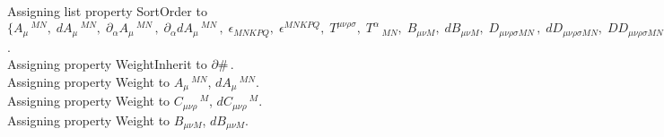 \documentclass[11pt]{article}
\begin{document}
Assigning list property SortOrder to $\{{A}_{\mu}\,^{M N},\; {dA}_{\mu}\,^{M N},\; {\partial}_{\alpha}{{A}_{\mu}\,^{M N}}\, ,\; {\partial}_{\alpha}{{dA}_{\mu}\,^{M N}}\, ,\; {\epsilon}_{M N K P Q},\; {\epsilon}^{M N K P Q},\; {T}^{\mu \nu \rho \sigma},\; {T}^{\alpha}\,_{M N},\; {B}_{\mu \nu M},\; {dB}_{\mu \nu M},\; {D}_{\mu \nu \rho \sigma M N}\, ,\; {dD}_{\mu \nu \rho \sigma M N},\; {DD}_{\mu \nu \rho \sigma M N},\; {F}_{\mu \nu \rho M},\; {F}_{\mu \nu \rho \sigma}\,^{M},\; {\partial}_{\mu}{{A}_{\mu}\,^{M N}}\, ,\; {\partial}_{\alpha}{{F}_{\mu \nu}\,^{M N}}\, ,\; {\partial}_{\alpha}{{B}_{\mu \nu M}}\, ,\; {\partial}_{\alpha}{{dB}_{\mu \nu M}}\, ,\; {\partial}_{\alpha}{{F}_{\mu \nu \rho M}}\, ,\; {\partial}_{\alpha}{{C}_{\mu \nu \rho}\,^{M}}\, ,\; {\partial}_{\alpha}{{dC}_{\mu \nu \rho}\,^{M}}\, ,\; {\partial}_{\alpha}{{F}_{\mu \nu \rho \sigma}\,^{M}}\, ,\; {\partial}_{\alpha}{{G}_{\mu \nu \rho \sigma M N}}\, ,\; {\partial}_{\alpha}{{dG}_{\mu \nu \rho \sigma M N}}\, ,\; {\delta}^{M1}\,_{M},\; {\delta}_{M1}\,^{M},\; a1,\; a2,\; a3,\; a4,\; a5,\; a6,\; a7,\; a8,\; a9,\; a10,\; a11,\; a12,\; b1,\; b2,\; b3,\; b4,\; b5,\; b6,\; b7,\; b8,\; b9,\; b10,\; b11,\; b12,\; c1,\; c2,\; c3,\; c4,\; c5,\; c6,\; c7,\; d1,\; d2,\; d3,\; d4,\; d5,\; d6,\; d7,\; {\Lambda}^{M N}\}$.
\\
Assigning property WeightInherit to $\partial{\#}\, $.
\\
Assigning property Weight to ${A}_{\mu}\,^{M N}$, ${dA}_{\mu}\,^{M N}$.
\\
Assigning property Weight to ${C}_{\mu \nu \rho}\,^{M}$, ${dC}_{\mu \nu \rho}\,^{M}$.
\\
Assigning property Weight to ${B}_{\mu \nu M}$, ${dB}_{\mu \nu M}$.
\\
\end{document}

